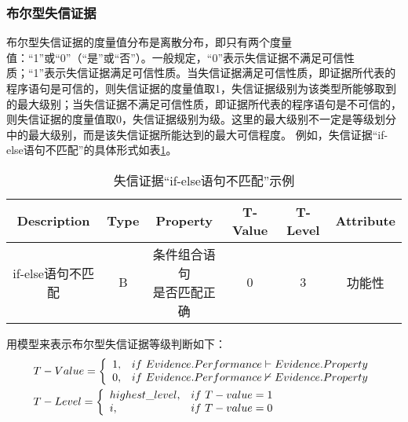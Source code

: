 \subsubsection{布尔型失信证据}
布尔型失信证据的度量值分布是离散分布，即只有两个度量值：“1”或“0”（“是”或“否”）。一般规定，“0”表示失信证据不满足可信性质；“1”表示失信证据满足可信性质。当失信证据满足可信性质，即证据所代表的程序语句是可信的，则失信证据的度量值取1，失信证据级别为该类型所能够取到的最大级别；当失信证据不满足可信性质，即证据所代表的程序语句是不可信的，则失信证据的度量值取0，失信证据级别为\uppercase\expandafter{}级。这里的最大级别不一定是等级划分中的最大级别，而是该失信证据所能达到的最大可信程度。
例如，失信证据“if-else语句不匹配”的具体形式如表\ref{example1}。
\begin{table}[htb]
\centering
\caption{失信证据“if-else语句不匹配”示例}
\begin{tabular}{|c|c|c|c|c|c|}
\hline
Description & Type & Property & T-Value & T-Level & Attribute \\
\hline
if-else语句不匹配 & B & \tabincell{c}{条件组合语句\\是否匹配正确} & 0 & 3 & 功能性\\
\hline
\end{tabular}
\label{example1}
\end{table}

用模型来表示布尔型失信证据等级判断如下：
\begin{align}
& T-Value=\left\{
\begin{array}{lr}
1, & if~Evidence.Performance \vdash Evidence.Property \\
0, & if~Evidence.Performance \nvdash Evidence.Property
\end{array}
\right.\\
& T-Level=\left\{
\begin{array}{lr}
highest\_level, & if~T-value=1 \\
\uppercase\expandafter{\romannumeral1}, & if~T-value=0
\end{array}
\right.
\end{align}

